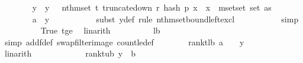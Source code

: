 \begin{isabellebody}
\ \ \ \ \ \ \isamarkupfalse%
\ y{\isacharprime}{\kern0pt}\ \ {\isachardoublequoteopen}y{\isacharprime}{\kern0pt}\ {\isacharequal}{\kern0pt}\ \ nth{\isacharunderscore}{\kern0pt}mset\ {\isacharparenleft}{\kern0pt}t{\isacharminus}{\kern0pt}{}{\isacharparenright}{\kern0pt}\ {\isacharbraceleft}{\kern0pt}{\isacharhash}{\kern0pt}truncate{\isacharunderscore}{\kern0pt}down\ r\ {\isacharparenleft}{\kern0pt}hash\ p\ x\ {\isasymomega}{\isacharparenright}{\kern0pt}{\isachardot}{\kern0pt}\ x\ {\isasymin}{\isacharhash}{\kern0pt}\ mset{\isacharunderscore}{\kern0pt}set\ {\isacharparenleft}{\kern0pt}set\ as{\isacharparenright}{\kern0pt}{\isacharhash}{\kern0pt}{\isacharbraceright}{\kern0pt}{\isachardoublequoteclose}\isanewline
\isanewline
\ \ \ \ \ \ \isamarkupfalse%
\ {\isachardoublequoteopen}a\ {\isacharless}{\kern0pt}\ y{\isachardoublequoteclose}\ \isanewline
\ \ \ \ \ \ \ \ \isamarkupfalse%
\ {\isacharparenleft}{\kern0pt}subst\ y{\isacharunderscore}{\kern0pt}def{\isacharcomma}{\kern0pt}\ rule\ nth{\isacharunderscore}{\kern0pt}mset{\isacharunderscore}{\kern0pt}bound{\isacharunderscore}{\kern0pt}left{\isacharunderscore}{\kern0pt}excl{\isacharparenright}{\kern0pt}\isanewline
\ \ \ \ \ \ \ \ \ \isamarkupfalse%
\ {\isacharparenleft}{\kern0pt}simp{\isacharparenright}{\kern0pt}\isanewline
\ \ \ \ \ \ \ \ \isamarkupfalse%
\ True\ t{\isacharunderscore}{\kern0pt}ge{\isacharunderscore}{\kern0pt}{}\ \isamarkupfalse%
\ linarith\isanewline
\ \ \ \ \ \ \ \ \isamarkupfalse%
\ lb\ \isanewline
\ \ \ \ \ \ \ \ \isamarkupfalse%
\ {\isacharparenleft}{\kern0pt}simp\ add{\isacharcolon}{\kern0pt}f{\isacharunderscore}{\kern0pt}def\ swap{\isacharunderscore}{\kern0pt}filter{\isacharunderscore}{\kern0pt}image\ count{\isacharunderscore}{\kern0pt}le{\isacharunderscore}{\kern0pt}def{\isacharparenright}{\kern0pt}\isanewline
\ \ \ \ \ \ \isamarkupfalse%
\ rank{\isacharunderscore}{\kern0pt}t{\isacharunderscore}{\kern0pt}lb{\isacharcolon}{\kern0pt}\ {\isachardoublequoteopen}a\ {\isacharplus}{\kern0pt}\ {}\ {\isasymle}\ y{\isachardoublequoteclose}\ \isanewline
\ \ \ \ \ \ \ \ \isamarkupfalse%
\ linarith\isanewline
\ \ \ \ \isanewline
\ \ \ \ \ \ \isamarkupfalse%
\ rank{\isacharunderscore}{\kern0pt}t{\isacharunderscore}{\kern0pt}ub{\isacharcolon}{\kern0pt}\ {\isachardoublequoteopen}y\ {\isasymle}\ b{\isachardoublequoteclose}\ \isanewline
\ \ \ \ \ \ \ \ \isamarkupfalse%

\end{isabellebody}
